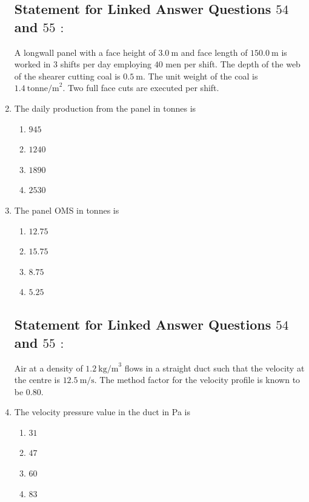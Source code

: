 \documentclass[journal,12pt,onecolumn]{IEEEtran}
\theoremstyle{remark}
\begin{document}
\begin{enumerate}
\subsection*{Statement for Linked Answer Questions $54$ and $55$ $\colon$}
A longwall panel with a face height of $3.0\ \text{m}$ and face length of $150.0\ \text{m}$ is worked in $3$ shifts per day employing $40$ men per shift. The depth of the web of the shearer cutting coal is $0.5\ \text{m}$. The unit weight of the coal is $1.4\ \text{tonne/m}^2$. Two full face cuts are executed per shift.
\item  The daily production from the panel in tonnes is


\hfill{}

\begin{multicols}{4}
\begin{enumerate}
\item $945$
\item $1240$
\item $1890$
\item $2530$
\end{enumerate}
\end{multicols}

\item The panel OMS in tonnes is


\hfill{}

\begin{multicols}{4}
\begin{enumerate}
\item $12.75$
\item $15.75$
\item $8.75$
\item $5.25$
\end{enumerate}
\end{multicols}

\subsection*{Statement for Linked Answer Questions $54$ and $55$ $\colon$}
Air at a density of $1.2\ \text{kg/m}^3$ flows in a straight duct such that the velocity at the centre is $12.5\ \text{m/s}$. The method factor for the velocity profile is known to be $0.80$.
\item The velocity pressure value in the duct in Pa is 


\hfill{}
\begin{multicols}{4}
\begin{enumerate}
\item $31$
\item $47$
\item $60$
\item $83$
\end{enumerate}
\end{multicols}


\end{enumerate}
\end{document}
